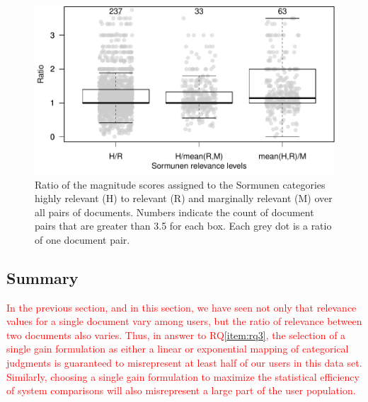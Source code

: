 \begin{figure}[t]
  \centering
  \includegraphics[width=.7\linewidth]{figs/kanoulos_aslam.pdf}
  \caption{Ratio of the magnitude scores assigned to 
    the Sormunen categories highly relevant (H) to relevant (R) and marginally relevant
    (M) over all pairs of documents. Numbers indicate the count of document pairs that 
    are greater than 3.5 for each box. Each grey dot is a ratio of one document pair.
  \label{fig:ka}
    }
\end{figure}

\subsection{Summary}

\textcolor{red}{ In the previous section, and in this section, we have
seen not only that relevance values for a single document vary among
users, but the ratio of relevance between two documents also varies.
Thus, in answer to RQ\ref{item:rq3}, the selection of a single gain
formulation as either a linear or exponential mapping of categorical
judgments is guaranteed to misrepresent at least half of our users in
this data set.
Similarly, choosing a single gain formulation to maximize the
statistical efficiency of system comparisons will also misrepresent a
large part of the user population.
} 




